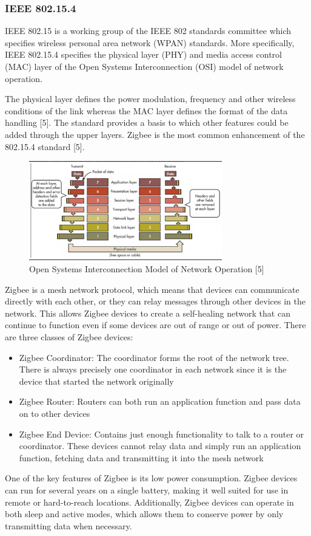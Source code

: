 \documentclass[12pt, a4paper]{article}
\begin{document}
\subsubsection{IEEE 802.15.4}
IEEE 802.15 is a working group of the IEEE 802 standards committee which specifies wireless personal area network (WPAN) standards. More specifically, 
IEEE 802.15.4 specifies the physical layer (PHY) and media access control (MAC) layer of the Open Systems Interconnection (OSI) model of network operation.

The physical layer defines the power modulation, frequency and other wireless conditions of the link whereas the MAC layer defines the format of the 
data handling [5]. The standard provides a basis to which other features could be added through the upper layers. Zigbee is the most common enhancement 
of the 802.15.4 standard [5]. 
\begin{figure}[h]
    \centering
    \includegraphics[width=0.75\textwidth]{osi model.png}
    \caption{Open Systems Interconnection Model of Network Operation [5]}
    \label{fig:osi_model}
\end{figure}
\newline
Zigbee is a mesh network protocol, which means that devices can communicate directly with each other, or they can relay messages through other 
devices in the network. This allows Zigbee devices to create a self-healing network that can continue to function even if some devices are out of range or 
out of power. There are three classes of Zigbee devices:
\begin{itemize}
    \item Zigbee Coordinator: The coordinator forms the root of the network tree. There is always precisely one coordinator in each network since it is 
    the device that started the network originally
    \item Zigbee Router: Routers can both run an application function and pass data on to other devices
    \item Zigbee End Device: Contains just enough functionality to talk to a router or coordinator. These devices cannot relay data and simply run 
    an application function, fetching data and transmitting it into the mesh network
\end{itemize}
One of the key features of Zigbee is its low power consumption. Zigbee devices can run for several years on a single battery, 
making it well suited for use in remote or hard-to-reach locations. Additionally, Zigbee devices can operate in both sleep and 
active modes, which allows them to conserve power by only transmitting data when necessary.
\end{document}
